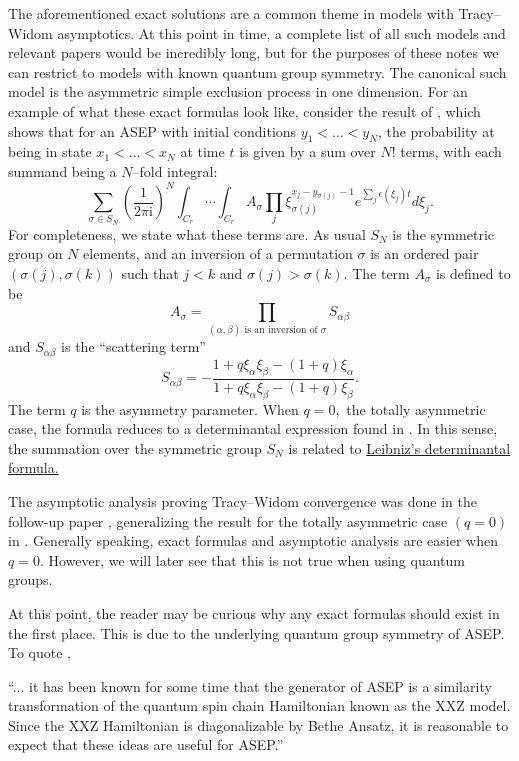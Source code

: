 \documentclass{ximera}
\begin{document}
The aforementioned exact solutions are a common theme in 
models with Tracy--Widom asymptotics. At this point in time,
a complete list of all such models and relevant papers would be incredibly long, but for
the purposes of these notes we can restrict to models with 
known quantum group symmetry. The canonical such model is 
the asymmetric simple exclusion process in one dimension. 
For an example of what these exact formulas look like, 
consider the result of \cite{TW08}, which shows that for 
an ASEP with initial conditions $y_1<\ldots<y_N$, the
probability at being in state $x_1<\ldots<x_N$ at time $t$
is given by a sum over $N!$ terms, with each summand being 
a $N$--fold integral:
$$
\sum_{\sigma \in S_N} \left(\frac{1}{2\pi \mathrm{i}}\right)^N\int_{C_r} \cdots \int_{C_r} A_{\sigma}\prod_j \xi_{\sigma(j)}^{x_j-y_{\sigma(j)}-1}e^{\sum_j \epsilon(\xi_j)t}d\xi_j.
$$
For completeness, we state what these terms are. As usual $S_N$ is the symmetric group on $N$ elements, 
and an inversion of a permutation $\sigma$ is an ordered pair $(\sigma(j),\sigma(k))$ such that
$j<k$ and $\sigma(j)>\sigma(k)$. The term $A_{\sigma}$ is defined to be
$$
A_{\sigma} = \prod_{(\alpha,\beta) \text{ is an inversion of } \sigma}{S_{\alpha\beta}}
$$
and $S_{\alpha\beta}$ is the ``scattering term''
$$
S_{\alpha\beta} = -\frac{1+q\xi_{\alpha}\xi_{\beta}-(1+q)\xi_{\alpha}}{1+q\xi_{\alpha}\xi_{\beta}-(1+q)\xi_{\beta}}.
$$
The term $q$ is the asymmetry parameter. When $q=0,$ the 
totally asymmetric case, the formula reduces to a determinantal 
expression found in \cite{Sch97a}. In this sense, the summation
over the symmetric group $S_N$ is related to 
\href{https://en.wikipedia.org/wiki/Leibniz_formula_for_determinants}{Leibniz's determinantal formula.}

The asymptotic analysis proving Tracy--Widom convergence
was done in the follow-up paper \cite{TW09}, generalizing the
result for the totally asymmetric case $(q=0)$ in \cite{Joh00}.
Generally speaking, exact formulas and asymptotic analysis are
easier when $q=0.$ However, we will later see that this is not 
true when using quantum groups. 

At this point, the reader may be curious why any exact formulas
should exist in the first place. This is due to the underlying 
quantum group symmetry of ASEP. To quote \cite{TW07}, 

``... it has been known for some time that the generator of ASEP
is a similarity transformation of the quantum spin chain Hamiltonian
known as the XXZ model. Since the XXZ Hamiltonian is diagonalizable
by Bethe Ansatz, it is reasonable to expect that these ideas are 
useful for ASEP.''
\end{document}
